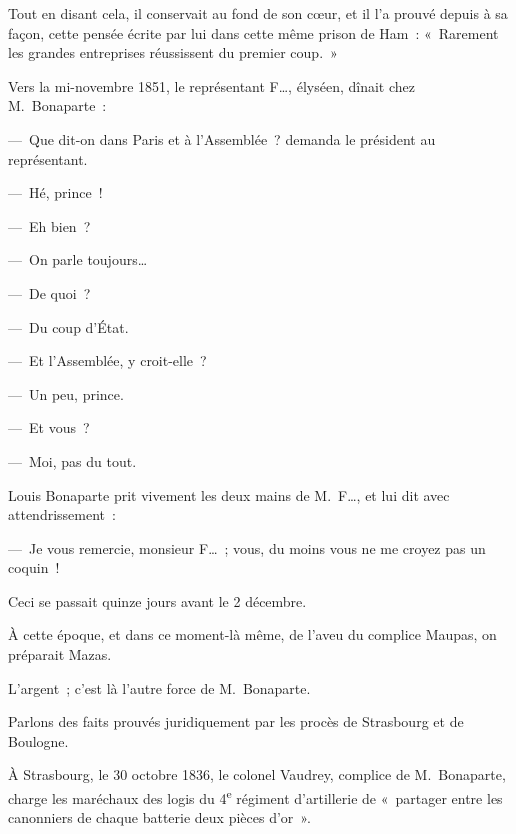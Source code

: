 \documentclass[french,twoside]{book} %
\begin{document}
\noindent Tout en disant cela, il conservait au fond de son cœur, et il l’a prouvé depuis à sa façon, cette pensée écrite par lui dans cette même prison de Ham : « Rarement les grandes entreprises réussissent du premier coup. »\par
Vers la mi-novembre 1851, le représentant F…, élyséen, dînait chez M. Bonaparte :\par
— Que dit-on dans Paris et à l’Assemblée ? demanda le président au représentant.\par
— Hé, prince !\par
— Eh bien ?\par
— On parle toujours…\par
— De quoi ?\par
— Du coup d’État.\par
— Et l’Assemblée, y croit-elle ?\par
— Un peu, prince.\par
— Et vous ?\par
— Moi, pas du tout.\par
Louis Bonaparte prit vivement les deux mains de M. F…, et lui dit avec attendrissement :\par
— Je vous remercie, monsieur F… ; vous, du moins vous ne me croyez pas un coquin !\par
Ceci se passait quinze jours avant le 2 décembre.\par
À cette époque, et dans ce moment-là même, de l’aveu du complice Maupas, on préparait Mazas.\par
L’argent ; c’est là l’autre force de M. Bonaparte.\par
Parlons des faits prouvés juridiquement par les procès de Strasbourg et de Boulogne.\par
À Strasbourg, le 30 octobre 1836, le colonel Vaudrey, complice de M. Bonaparte, charge les maréchaux des logis du 4\textsuperscript{e} régiment d’artillerie de « partager entre les canonniers de chaque batterie deux pièces d’or ».\par
\end{document}

